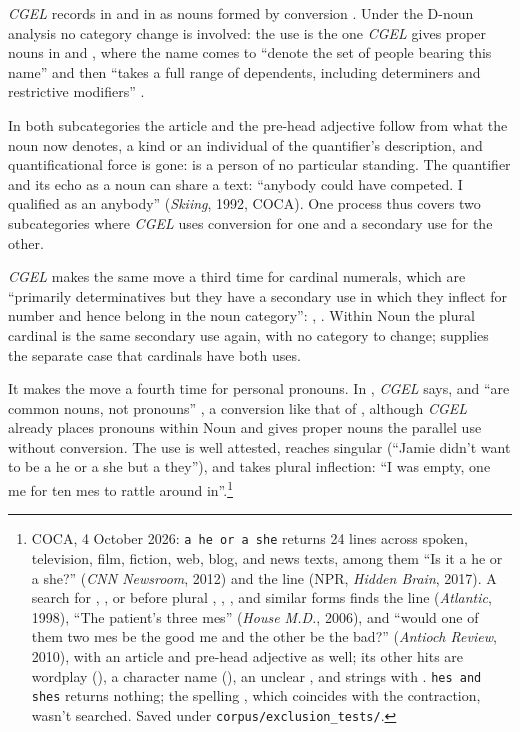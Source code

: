 \documentclass[12pt]{article}
\begin{document}
\textit{CGEL} records  in  and  in  as nouns formed by conversion \citep[423, n.~43]{huddleston2002}. Under the D-noun analysis no category change is involved: the use is the one \textit{CGEL} gives proper nouns in  and , where the name comes to \enquote{denote the set of people bearing this name} and then \enquote{takes a full range of dependents, including determiners and restrictive modifiers} \citep[521]{huddleston2002}.

In both subcategories the article and the pre-head adjective follow from what the noun now denotes, a kind or an individual of the quantifier's description, and quantificational force is gone:  is a person of no particular standing. The quantifier and its echo as a noun can share a text: \enquote{anybody could have competed. I qualified as an anybody} (\textit{Skiing}, 1992, COCA). One process thus covers two subcategories where \textit{CGEL} uses conversion for one and a secondary use for the other.

\textit{CGEL} makes the same move a third time for cardinal numerals, which are \enquote{primarily determinatives but they have a secondary use in which they inflect for number and hence belong in the noun category}: ,  \citep[385]{huddleston2002}. Within Noun the plural cardinal is the same secondary use again, with no category to change; \textcite{reynolds2026numerals} supplies the separate case that cardinals have both uses.

It makes the move a fourth time for personal pronouns. In , \textit{CGEL} says,  and  \enquote{are common nouns, not pronouns} \citep[429, n.~46]{huddleston2002}, a conversion like that of , although \textit{CGEL} already places pronouns within Noun and gives proper nouns the parallel use without conversion. The use is well attested, reaches singular  (\enquote{Jamie didn't want to be a he or a she but a they}), and takes plural inflection: \enquote{I was empty, one me for ten mes to rattle around in}.\footnote{COCA, 4 October 2026: \texttt{a he or a she} returns 24 lines across spoken, television, film, fiction, web, blog, and news texts, among them \enquote{Is it a he or a she?} (\textit{CNN Newsroom}, 2012) and the  line (NPR, \textit{Hidden Brain}, 2017). A search for , , or  before plural , , , and similar forms finds the  line (\textit{Atlantic}, 1998), \enquote{The patient's three mes} (\textit{House M.D.}, 2006), and \enquote{would one of them two mes be the good me and the other be the bad?} (\textit{Antioch Review}, 2010), with an article and pre-head adjective as well; its other hits are wordplay (), a character name (), an unclear , and strings with . \texttt{hes and shes} returns nothing; the spelling , which coincides with the contraction, wasn't searched. Saved under \texttt{corpus/exclusion\_tests/}.}
\end{document}

